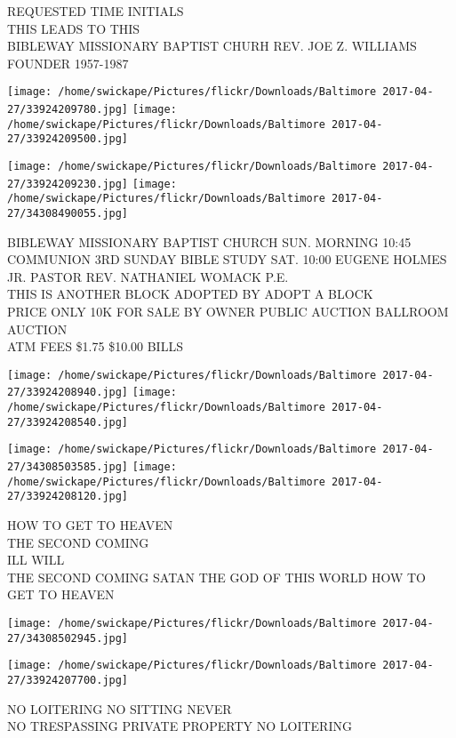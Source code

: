 \documentclass[10pt,letterpaper]{article}
\begin{document}
REQUESTED TIME INITIALS\\
THIS LEADS TO THIS\\
BIBLEWAY MISSIONARY BAPTIST CHURH REV. JOE Z. WILLIAMS FOUNDER 1957{-}1987
\pagebreak

\texttt{[image: /home/swickape/Pictures/flickr/Downloads/Baltimore 2017-04-27/33924209780.jpg]}
\texttt{[image: /home/swickape/Pictures/flickr/Downloads/Baltimore 2017-04-27/33924209500.jpg]}

\texttt{[image: /home/swickape/Pictures/flickr/Downloads/Baltimore 2017-04-27/33924209230.jpg]}
\texttt{[image: /home/swickape/Pictures/flickr/Downloads/Baltimore 2017-04-27/34308490055.jpg]}

BIBLEWAY MISSIONARY BAPTIST CHURCH SUN. MORNING 10:45 COMMUNION 3RD SUNDAY BIBLE STUDY SAT. 10:00 EUGENE HOLMES JR. PASTOR REV. NATHANIEL WOMACK P.E.\\
THIS IS ANOTHER BLOCK ADOPTED BY ADOPT A BLOCK\\
PRICE ONLY 10K FOR SALE BY OWNER PUBLIC AUCTION BALLROOM AUCTION\\
ATM FEES \$1.75 \$10.00 BILLS
\pagebreak

\texttt{[image: /home/swickape/Pictures/flickr/Downloads/Baltimore 2017-04-27/33924208940.jpg]}
\texttt{[image: /home/swickape/Pictures/flickr/Downloads/Baltimore 2017-04-27/33924208540.jpg]}

\texttt{[image: /home/swickape/Pictures/flickr/Downloads/Baltimore 2017-04-27/34308503585.jpg]}
\texttt{[image: /home/swickape/Pictures/flickr/Downloads/Baltimore 2017-04-27/33924208120.jpg]}

HOW TO GET TO HEAVEN\\
THE SECOND COMING\\
ILL WILL\\
THE SECOND COMING SATAN THE GOD OF THIS WORLD HOW TO GET TO HEAVEN
\pagebreak

\texttt{[image: /home/swickape/Pictures/flickr/Downloads/Baltimore 2017-04-27/34308502945.jpg]}

\vspace{0.25in}
\texttt{[image: /home/swickape/Pictures/flickr/Downloads/Baltimore 2017-04-27/33924207700.jpg]}

NO LOITERING NO SITTING NEVER\\
NO TRESPASSING PRIVATE PROPERTY NO LOITERING
\pagebreak
\end{document}
